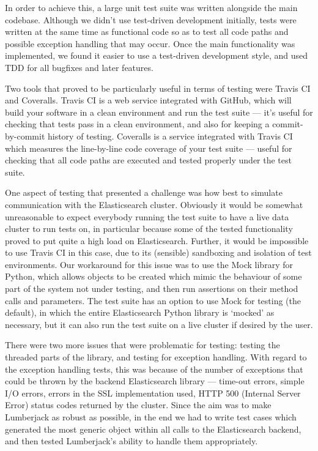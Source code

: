 \documentclass[a4paper,11pt]{article} %
\begin{document}
In order to achieve this, a large unit test suite was written alongside the
main codebase.  Although we didn't use test-driven development initially, tests
were written at the same time as functional code so as to test all code paths
and possible exception handling that may occur.  Once the main functionality
was implemented, we found it easier to use a test-driven development style, and
used TDD for all bugfixes and later features.

Two tools that proved to be particularly useful in terms of testing were Travis
CI and Coveralls.  Travis CI is a web service integrated with GitHub, which
will build your software in a clean environment and run the test suite --- it's
useful for checking that tests pass in a clean environment, and also for
keeping a commit-by-commit history of testing.  Coveralls is a service
integrated with Travis CI which measures the line-by-line code coverage of your
test suite --- useful for checking that all code paths are executed and tested
properly under the test suite.

One aspect of testing that presented a challenge was how best to simulate
communication with the Elasticsearch cluster.  Obviously it would be somewhat
unreasonable to expect everybody running the test suite to have a live data
cluster to run tests on, in particular because some of the tested functionality
proved to put quite a high load on Elasticsearch.  Further, it would be
impossible to use Travis CI in this case, due to its (sensible) sandboxing and
isolation of test environments.  Our workaround for this issue was to use the
Mock library for Python, which allows objects to be created which mimic the
behaviour of some part of the system not under testing, and then run assertions
on their method calls and parameters.  The test suite has an option to use Mock
for testing (the default), in which the entire Elasticsearch Python library is
`mocked' as necessary, but it can also run the test suite on a live cluster if
desired by the user.

There were two more issues that were problematic for testing: testing the
threaded parts of the library, and testing for exception handling.  With regard
to the exception handling tests, this was because of the number of exceptions
that could be thrown by the backend Elasticsearch library --- time-out errors,
simple I/O errors, errors in the SSL implementation used, HTTP 500 (Internal
Server Error) status codes returned by the cluster.  Since the aim was to make
Lumberjack as robust as possible, in the end we had to write test cases which
generated the most generic  object within all calls to the
Elasticsearch backend, and then tested Lumberjack's ability to handle them
appropriately.
\end{document}

